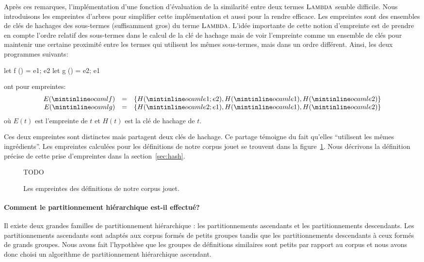 Après ces remarques, l'implémentation d'une fonction d'évaluation de
la similarité entre deux termes $\textsc{Lambda}$ semble difficile. Nous
introduisons les empreintes d'arbres pour simplifier cette
implémentation et aussi pour la rendre efficace. Les empreintes sont
des ensembles de clés de hachages des sous-termes (suffisamment gros)
du terme $\textsc{Lambda}$. L'idée importante de cette notion d'empreinte
est de prendre en compte l'ordre relatif des sous-termes dans le
calcul de la clé de hachage mais de voir l'empreinte comme un ensemble
de clés pour maintenir une certaine proximité entre les termes qui
utilisent les mêmes sous-termes, mais dans un ordre différent. Ainsi,
les deux programmes suivants:
\begin{ocaml}
let f () = e1; e2
let g () = e2; e1
\end{ocaml}
\noindent ont pour empreintes:
\[
\begin{array}{rcl}
E(\iocaml{f}) &=& \{ H(\iocaml{e1; e2}), H(\iocaml{e1}), H(\iocaml{e2}) \} \\
E(\iocaml{g}) &=& \{ H(\iocaml{e2; e1}), H(\iocaml{e1}), H(\iocaml{e2}) \}
\end{array}
\]
\noindent où $E(t)$ est l'empreinte de $t$ et $H(t)$ est la clé de hachage de $t$.

Ces deux empreintes sont distinctes mais partagent deux clés de
hachage. Ce partage témoigne du fait qu'elles ``utilisent les mêmes
ingrédients''. Les empreintes calculées pour les définitions de notre
corpus jouet se trouvent dans la figure~\ref{fig:hash}. Nous décrivons
la définition précise de cette prise d'empreintes dans la
section~\ref{sec:hash}.

\begin{figure}
TODO
\caption{Les empreintes des définitions de notre corpus jouet.}
\label{fig:hash}
\end{figure}

\paragraph{Comment le partitionnement hiérarchique est-il effectué?}

Il existe deux grandes familles de partitionnement hiérarchique : les
partitionnements ascendants et les partitionnements descendants. Les
partitionnements ascendants sont adaptés aux corpus formés de petits
groupes tandis que les partitionnements descendants à ceux formés de
grands groupes. Nous avons fait l'hypothèse que les groupes de
définitions similaires sont petits par rapport au corpus et nous avons
donc choisi un algorithme de partitionnement hiérarchique ascendant.

